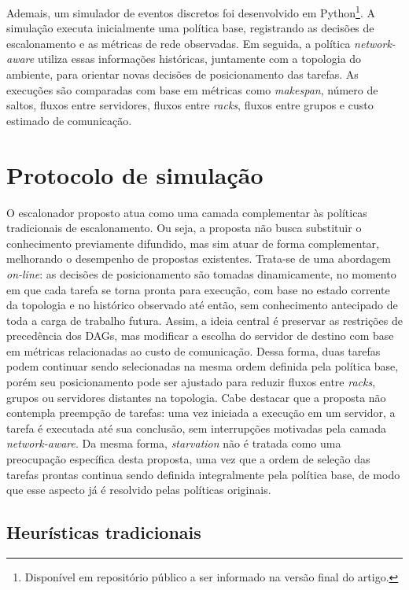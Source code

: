 \documentclass[12pt]{article}
\begin{document}
Ademais, um simulador de eventos discretos foi desenvolvido em Python\footnote{Disponível em repositório público a ser informado na versão final do artigo.}. 
%
A simulação executa inicialmente uma política base, registrando as decisões de escalonamento e as métricas de rede observadas. 
%
Em seguida, a política \textit{network-aware} utiliza essas informações históricas, juntamente com a topologia do ambiente, para orientar novas decisões de posicionamento das tarefas. 
%
As execuções são comparadas com base em métricas como \textit{makespan}, número de saltos, fluxos entre servidores, fluxos entre \textit{racks}, fluxos entre grupos e custo estimado de comunicação.





\section{Protocolo de simulação}
\label{sec:protocolo_simulacao}

O escalonador proposto atua como uma camada complementar às políticas tradicionais de escalonamento.
%
Ou seja, a proposta não busca substituir o conhecimento previamente difundido, mas sim atuar de forma complementar, melhorando o desempenho de propostas existentes.
%
Trata-se de uma abordagem \textit{on-line}: as decisões de posicionamento são tomadas dinamicamente, no momento em que cada tarefa se torna pronta para execução, com base no estado corrente da topologia e no histórico observado até então, sem conhecimento antecipado de toda a carga de trabalho futura.
%
Assim, a ideia central é preservar as restrições de precedência dos DAGs, mas modificar a escolha do servidor de destino com base em métricas relacionadas ao custo de comunicação. 
%
Dessa forma, duas tarefas podem continuar sendo selecionadas na mesma ordem definida pela política base, porém seu posicionamento pode ser ajustado para reduzir fluxos entre \textit{racks}, grupos ou servidores distantes na topologia.
%
Cabe destacar que a proposta não contempla preempção de tarefas: uma vez iniciada a execução em um servidor, a tarefa é executada até sua conclusão, sem interrupções motivadas pela camada \textit{network-aware}.
%
Da mesma forma, \textit{starvation} não é tratada como uma preocupação específica desta proposta, uma vez que a ordem de seleção das tarefas prontas continua sendo definida integralmente pela política base, de modo que esse aspecto já é resolvido pelas políticas originais.


\subsection{Heurísticas tradicionais}
\label{subsec:politicas_base}
\end{document}
